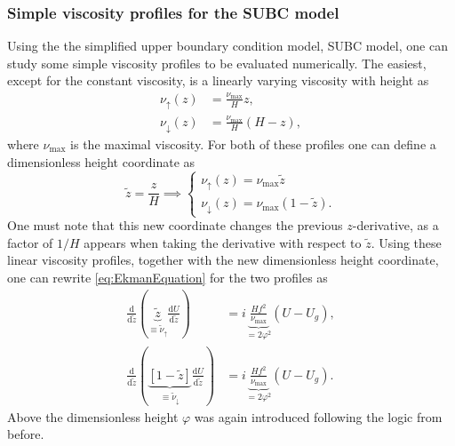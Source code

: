 \subsubsection{Simple viscosity profiles for the SUBC model}
Using the the simplified upper boundary condition model, SUBC model, one can study some simple viscosity profiles to be evaluated numerically. The easiest, except for the constant viscosity, is a linearly varying viscosity with height as 
\begin{subequations}
    \label{eq:LinearProfiles}   
 \begin{align}
    \label{eq:LinearIncreasing}
    \nu_\uparrow(z)&=\frac{\nu_\text{max}}{H}z, \\
    \label{eq:LinearDecreasing}
    \nu_\downarrow(z)&=\frac{\nu_\text{max}}{H}\left(H-z\right), 
\end{align}
\end{subequations}
where $\nu_\text{max}$ is the maximal viscosity. For both of these profiles one can define a dimensionless height coordinate as 
\begin{equation}
    \tilde z = \frac{z}{H} \implies 
    \begin{cases}
        \nu_\uparrow(z)=\nu_\text{max}\tilde z \\
        \nu_\downarrow(z)=\nu_\text{max}\left(1-\tilde z\right). 
    \end{cases}
\end{equation}
One must note that this new coordinate changes the previous $z$-derivative, as a factor of $1/H$ appears when taking the derivative with respect to $\tilde z$. Using these linear viscosity profiles, together with the new dimensionless height coordinate, one can rewrite \autoref{eq:EkmanEquation} for the two profiles as 
\begin{subequations}
\label{eq:15Linear}
\begin{align}
    \label{eq:15LinearIncreasing}
    \frac{\mathrm{d}}{\mathrm{d} \tilde z}\left(\underbrace{\tilde z }_{\equiv\tilde\nu_\uparrow}\frac{\mathrm{d} U}{\mathrm{d} \tilde z}\right)&=i\underbrace{\frac{Hf^2}{\nu_\text{max}}}_{=2\varphi^2}(U-U_g),\\
    \label{eq:15LinearDecreasing}
    \frac{\mathrm{d}}{\mathrm{d} \tilde z}\left(\underbrace{\left[1-\tilde z \right]}_{\equiv\tilde\nu_\downarrow}\frac{\mathrm{d} U}{\mathrm{d} \tilde z}\right)&=i\underbrace{\frac{Hf^2}{\nu_\text{max}}}_{=2\varphi^2}(U-U_g).
\end{align}
\end{subequations}
Above the dimensionless height $\varphi$ was again introduced following the logic from before.

